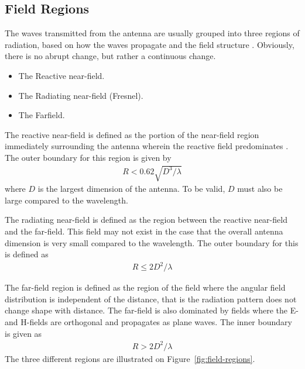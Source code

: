 \subsection{Field Regions}
The waves transmitted from the antenna are usually grouped into three regions of radiation, based on how the waves propagate and the field structure \cite{balanis2012antenna}. Obviously, there is no abrupt change, but rather a continuous change.
\begin{itemize}
\item The Reactive near-field.
\item The Radiating near-field (Fresnel).
\item The Farfield.
\end{itemize}

The reactive near-field is defined as the portion of the near-field region immediately surrounding the antenna wherein the reactive field predominates \cite{balanis2012antenna}. The outer boundary for this region is given by \cite{balanis2012antenna}
\begin{align} %
  R < 0.62 \sqrt{D^3/\lambda}
\end{align}
where $D$ is the largest dimension of the antenna. To be valid, $D$ must also be large compared to the wavelength.

The radiating near-field is defined as the region between the reactive near-field and the far-field. This field may not exist in the case that the overall antenna dimension is very small compared to the wavelength. The outer boundary for this is defined as \cite{balanis2012antenna}
\begin{align} %
  R \leq 2D^2/\lambda
\end{align}

The far-field region is defined as the region of the field where the angular field distribution is independent of the distance, that is the radiation pattern does not change shape with distance. The far-field is also dominated by fields where the E- and H-fields are orthogonal and propagates as plane waves. The inner boundary is given as \cite{balanis2012antenna}
\begin{align} %
  R > 2D^2/\lambda
\end{align}
The three different regions are illustrated on Figure~\ref{fig:field-regions}. 

